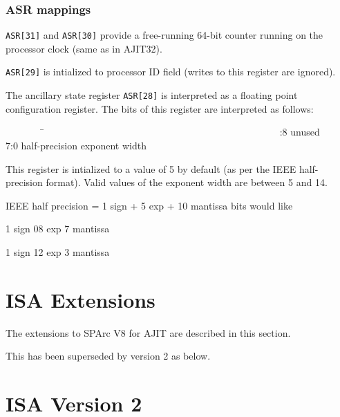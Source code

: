 \documentclass{book}
\begin{document}
\subsubsection{ASR mappings}
\label{sec:asr:mappings}


\texttt{ASR[31]} and \texttt{ASR[30]}  provide a free-running 64-bit counter
running on the processor clock (same as in AJIT32).

\texttt{ASR[29]} is intialized to processor ID field (writes to this
register are ignored).

The ancillary  state register \texttt{ASR[28]}  is interpreted
as a floating point configuration  register.  The bits of this
register are interpreted as follows:
\begin{tabbing}
  ~~~~~~~~\=~~~~~~~~~~~~~~~~~~~~~~~~~~~~~~~~~~~~~~~~~~~~~~~~ :8 \> unused \\
  7:0  \>  half-precision exponent width
\end{tabbing}
This register is intialized to a value of 5 by default (as
per the IEEE half-precision format).  Valid values of the
exponent width are between 5 and 14.

IEEE half precision = 1 sign + 5 exp + 10 mantissa bits
would like\\ 		
\centerline{1 sign 08 exp 7 mantissa}
\centerline{1 sign 12 exp 3 mantissa}

\newpage
\section{ISA Extensions}
\label{sec:isa:extns}

The extensions to SPArc V8 for AJIT are described in this section.

% 
This has been superseded by version 2 as below.

\section{ISA Version 2}
\label{sec:isa:v2}




\newpage



\newpage

\end{document}
